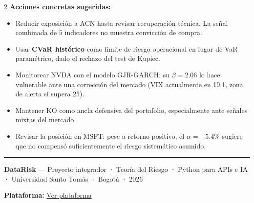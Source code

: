 \documentclass[10pt,a4paper]{article}
\begin{document}
\begin{multicols}{2}
\vspace{4pt}
\textbf{Acciones concretas sugeridas:}
\begin{itemize}
  \item Reducir exposición a ACN hasta revisar recuperación técnica. La señal combinada de 5 indicadores no muestra convicción de compra.
  \item Usar \textbf{CVaR histórico} como límite de riesgo operacional en lugar de VaR paramétrico, dado el rechazo del test de Kupiec.
  \item Monitorear NVDA con el modelo GJR-GARCH: su $\beta=2.06$ lo hace vulnerable ante una corrección del mercado (VIX actualmente en 19.1, zona de alerta si supera 25).
  \item Mantener KO como ancla defensiva del portafolio, especialmente ante señales mixtas del mercado.
  \item Revisar la posición en MSFT: pese a retorno positivo, el $\alpha=-5.4\%$ sugiere que no compensó suficientemente el riesgo sistemático asumido.
\end{itemize}

\end{multicols}

\vspace{6pt}
\color{bordergray}\rule{\linewidth}{0.4pt}\color{black}
\vspace{2pt}

{\footnotesize\color{textgray}
\textbf{DataRisk} — Proyecto integrador · Teoría del Riesgo · Python para APIs e IA · Universidad Santo Tomás · Bogotá · 2026 \hfill

\textbf{Plataforma:} \href{https://proyecto-teoria-python-aleja-xime.streamlit.app/}{Ver plataforma}
}
\end{document}
